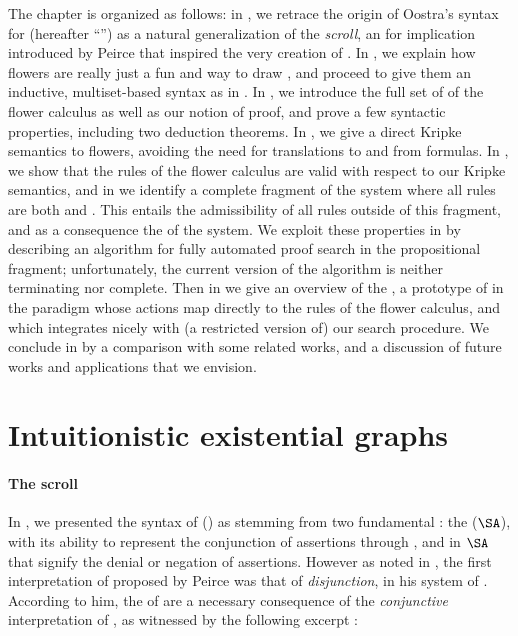 \begin{scope}
The chapter is organized as follows: in , we retrace the origin of
Oostra's syntax for   (hereafter ``'') as a
natural generalization of the \emph{scroll}, an  for implication introduced
by Peirce that inspired the very creation of . In , we
explain how flowers are really just a fun and  way to draw
, and proceed to give them an inductive, multiset-based syntax as in
. In , we introduce the full set of  of the flower calculus as well as our notion of proof, and prove a few
syntactic properties, including two deduction theorems. In ,
we give a direct Kripke semantics to flowers, avoiding the need for translations
to and from formulas. In , we show that the rules of the
flower calculus are valid with respect to our Kripke semantics, and in
 we identify a complete fragment of the system where all
rules are both \emph{} and \emph{}. This entails the
admissibility of all rules outside of this fragment, and as a consequence the
 of the system. We exploit these properties in
 by describing an algorithm for fully automated proof
search in the propositional fragment; unfortunately, the current version of the
algorithm is neither terminating nor complete. Then in 
we give an overview of the , a prototype of  in the
 paradigm whose actions map directly to the rules of the flower
calculus, and which integrates nicely with (a restricted version of) our search
procedure. We conclude in  by a comparison with some related
works, and a discussion of future works and applications that we envision.


\section{Intuitionistic existential graphs}

\paragraph{The scroll}

In , we presented the syntax of  () as
stemming from two fundamental : the  ($\SA$),
with its ability to represent the conjunction of assertions through
\emph{}, and \emph{} in $\SA$ that signify the denial or
negation of assertions. However as noted in , the first
interpretation of  proposed by Peirce was that of
\emph{disjunction}, in his system of . According to him,
the  of  are a necessary consequence of the
\emph{conjunctive} interpretation of , as witnessed by the
following excerpt :


\end{scope}
